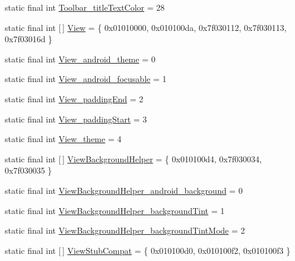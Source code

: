 \begin{DoxyCompactItemize}
\item 
static final int \mbox{\hyperlink{classcom_1_1google_1_1android_1_1gms_1_1R_1_1styleable_a68c08effedd9bad61403917af7963555}{Toolbar\+\_\+title\+Text\+Color}} = 28
\item 
static final int \mbox{[}$\,$\mbox{]} \mbox{\hyperlink{classcom_1_1google_1_1android_1_1gms_1_1R_1_1styleable_a9fb755017e322d9c9296112c6bbd0600}{View}} = \{ 0x01010000, 0x010100da, 0x7f030112, 0x7f030113, 0x7f03016d \}
\item 
static final int \mbox{\hyperlink{classcom_1_1google_1_1android_1_1gms_1_1R_1_1styleable_aef40869fe74a6e51a0c650302308a4ba}{View\+\_\+android\+\_\+theme}} = 0
\item 
static final int \mbox{\hyperlink{classcom_1_1google_1_1android_1_1gms_1_1R_1_1styleable_a2d43f086712445454eedddc90d16b3f0}{View\+\_\+android\+\_\+focusable}} = 1
\item 
static final int \mbox{\hyperlink{classcom_1_1google_1_1android_1_1gms_1_1R_1_1styleable_af6d8d9332a674016f0af758b982dc7b4}{View\+\_\+padding\+End}} = 2
\item 
static final int \mbox{\hyperlink{classcom_1_1google_1_1android_1_1gms_1_1R_1_1styleable_a26f1cc6914209dcd2aa660093b0cb1e6}{View\+\_\+padding\+Start}} = 3
\item 
static final int \mbox{\hyperlink{classcom_1_1google_1_1android_1_1gms_1_1R_1_1styleable_a8309eaa59ee71bc19d9d09ac4f011d32}{View\+\_\+theme}} = 4
\item 
static final int \mbox{[}$\,$\mbox{]} \mbox{\hyperlink{classcom_1_1google_1_1android_1_1gms_1_1R_1_1styleable_a496f957c024bb0c0bf73881ea54319c7}{View\+Background\+Helper}} = \{ 0x010100d4, 0x7f030034, 0x7f030035 \}
\item 
static final int \mbox{\hyperlink{classcom_1_1google_1_1android_1_1gms_1_1R_1_1styleable_ad3e08e434a9df209653d1b379525f180}{View\+Background\+Helper\+\_\+android\+\_\+background}} = 0
\item 
static final int \mbox{\hyperlink{classcom_1_1google_1_1android_1_1gms_1_1R_1_1styleable_a6b710d47edd4193cae36beabda0b6498}{View\+Background\+Helper\+\_\+background\+Tint}} = 1
\item 
static final int \mbox{\hyperlink{classcom_1_1google_1_1android_1_1gms_1_1R_1_1styleable_a53786afd81f1361c7400ce2a1a6f61b7}{View\+Background\+Helper\+\_\+background\+Tint\+Mode}} = 2
\item 
static final int \mbox{[}$\,$\mbox{]} \mbox{\hyperlink{classcom_1_1google_1_1android_1_1gms_1_1R_1_1styleable_a4ffc4c88ff1d13dfc6adb6d8afb39f1c}{View\+Stub\+Compat}} = \{ 0x010100d0, 0x010100f2, 0x010100f3 \}

\end{DoxyCompactItemize}
